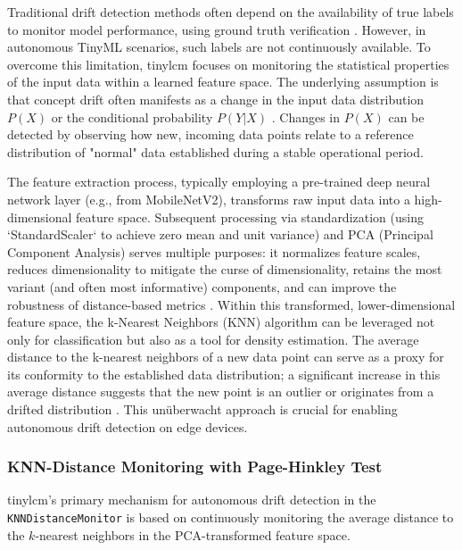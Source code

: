 Traditional drift detection methods often depend on the availability of true labels to monitor model performance, using ground truth verification \cite{disabatoTinyMachineLearning2024, pavanTyBoxAutomaticDesign2024}. However, in autonomous TinyML scenarios, such labels are not continuously available. To overcome this limitation, \gls{tinylcm} focuses on monitoring the statistical properties of the input data within a learned feature space. The underlying assumption is that concept drift often manifests as a change in the input data distribution $P(X)$ or the conditional probability $P(Y|X)$ \cite{gamaSurveyConceptDrift2014,disabatoTinyMachineLearning2024}. Changes in $P(X)$ can be detected by observing how new, incoming data points relate to a reference distribution of "normal" data established during a stable operational period.

The feature extraction process, typically employing a pre-trained deep neural network layer (e.g., from MobileNetV2), transforms raw input data into a high-dimensional feature space. Subsequent processing via standardization (using `StandardScaler` to achieve zero mean and unit variance) and PCA (Principal Component Analysis) serves multiple purposes: it normalizes feature scales, reduces dimensionality to mitigate the curse of dimensionality, retains the most variant (and often most informative) components, and can improve the robustness of distance-based metrics \cite{jolliffePrincipalComponentAnalysis2016,disabatoTinyMachineLearning2024}. Within this transformed, lower-dimensional feature space, the k-Nearest Neighbors (KNN) algorithm can be leveraged not only for classification but also as a tool for density estimation. The average distance to the k-nearest neighbors of a new data point can serve as a proxy for its conformity to the established data distribution; a significant increase in this average distance suggests that the new point is an outlier or originates from a drifted distribution \cite{chandolaAnomalyDetectionSurvey2009}. This unüberwacht approach is crucial for enabling autonomous drift detection on edge devices.

\subsubsection{KNN-Distance Monitoring with Page-Hinkley Test}
\label{sssec:tinylcm_knn_page_hinkley}

\gls{tinylcm}'s primary mechanism for autonomous drift detection in the \texttt{KNNDistanceMonitor} is based on continuously monitoring the average distance to the \(k\)-nearest neighbors in the PCA-transformed feature space.

